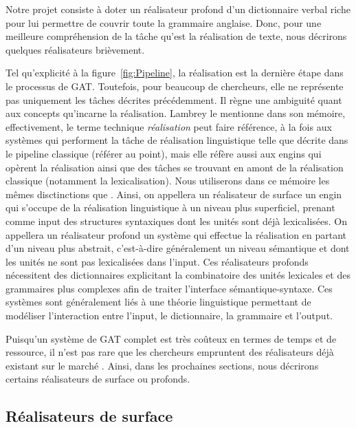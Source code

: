 Notre projet consiste à doter un réalisateur profond d'un dictionnaire verbal riche pour lui permettre de couvrir toute la grammaire anglaise. Donc, pour une meilleure compréhension de la tâche qu'est la réalisation de texte, nous décrirons quelques réalisateurs brièvement.

Tel qu'explicité à la figure~\ref{fig:Pipeline}, la réalisation est la dernière étape dans le processus de \ac{GAT}. Toutefois, pour beaucoup de chercheurs, elle ne représente pas uniquement les tâches décrites précédemment. Il règne une ambiguité quant aux concepts qu'incarne la réalisation. Lambrey le mentionne \citep{LambreyImplementationcollocationspour2017} dans son mémoire, effectivement, le terme technique \emph{réalisation} peut faire référence, à la fois aux systèmes qui performent la tâche de réalisation linguistique telle que décrite dans le pipeline classique (référer au point), mais elle réfère aussi aux engins qui opèrent la réalisation ainsi que des tâches se trouvant en amont de la réalisation classique (notamment la lexicalisation). Nous utiliserons dans ce mémoire les mêmes disctinctions que \citep{LambreyImplementationcollocationspour2017}. Ainsi, on appellera un réalisateur de surface un engin qui s'occupe de la réalisation linguistique à un niveau plus superficiel, prenant comme input des structures syntaxiques dont les unités sont déjà lexicalisées. On appellera un réalisateur profond un système qui effectue la réalisation en partant d'un niveau plus abstrait, c'est-à-dire généralement un niveau sémantique et dont les unités ne sont pas lexicalisées dans l'input. Ces réalisateurs profonds nécessitent des dictionnaires explicitant la combinatoire des unités lexicales et des grammaires plus complexes afin de traiter l'interface sémantique-syntaxe. Ces systèmes sont généralement liés à une théorie linguistique permettant de modéliser l'interaction entre l'input, le dictionnaire, la grammaire et l'output.

Puisqu'un système de \ac{GAT} complet est très coûteux en termes de temps et de ressource, il n'est pas rare que les chercheurs empruntent des réalisateurs déjà existant sur le marché \citep{EssersChoosingSurfaceRealiser1998}. Ainsi, dans les prochaines sections, nous décrirons certains réalisateurs de surface ou profonds.



\subsection{Réalisateurs de surface}

